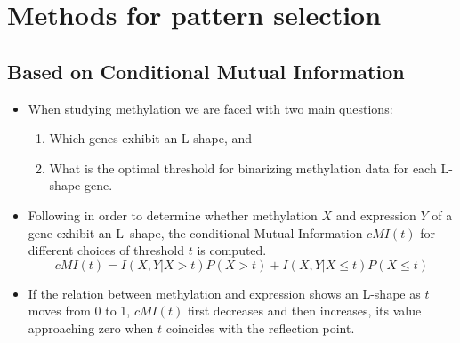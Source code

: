 \section{Methods for pattern selection}

\subsection{Based on Conditional Mutual Information}
\begin{itemize}
\item When studying methylation we are faced with two main questions:
  \begin{enumerate}
  \item Which genes exhibit an L-shape, and 
  \item What is the optimal threshold for binarizing
methylation data for each L-shape gene.
  \end{enumerate}
\item Following \cite{Liu} in order to determine whether methylation $X$ and expression $Y$ of a gene exhibit an L--shape, the conditional Mutual Information $cMI(t)$ for different choices of threshold $t$ is computed.
\[
\mathit{cMI}(t)=I(X,Y|X>t)P(X>t) + I(X,Y|X\le t)P(X\le t)
\]
\item If the relation between methylation and expression shows an L-shape  as $t$ moves from 0 to 1, $\mathit{cMI}(t)$ first decreases and then increases, its value approaching zero when $t$ coincides with the reflection point. 
\end{itemize}
 